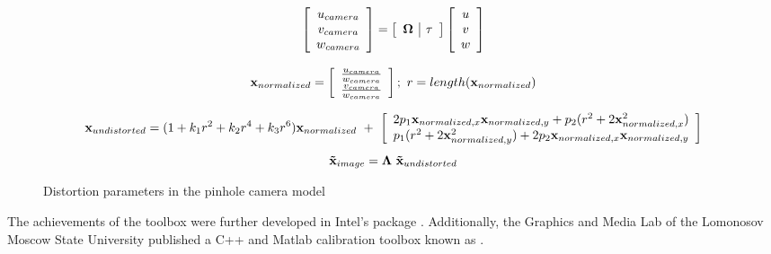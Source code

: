 \documentclass{ucl_thesis}
\begin{document}
\begin{figure}[h!]
    \begin{equation*}
	\left[\begin{array}{c}
		u_{camera} \\
		v_{camera} \\
		w_{camera} \\
	\end{array} \right]
	=
    	\left[\begin{array}{c|c}
	    	{\bf \Omega} & {\bf \tau}
	\end{array} \right]
	\left[\begin{array}{c}
	    u \\
	    	v \\
	    w \\
	\end{array} \right]
    \end{equation*}
    
    \begin{equation*}
	{\bf x}_{normalized} = 
 	\left[\begin{array}{c}
	    \frac{ u_{camera} }{ w_{camera} } \\
	    \frac{ v_{camera} }{ w_{camera} } \\
	\end{array} \right]; 
	~r = length(	{\bf x}_{normalized} )
    \end{equation*}

    \begin{equation*}
	{\bf x}_{undistorted}
	=
	(1 + k_1 r^2 + k_2 r^4 + k_3 r^6 ) {\bf x}_{normalized} 
	~+~ 
	\left[\begin{array}{c}
	    2 p_1 {\bf x}_{normalized,x} {\bf x}_{normalized,y} + p_2 ( r^2 + 2{\bf x}_{normalized,x}^2) \\
	    p_1(r^2+2{\bf x}_{normalized,y}^2) + 2 p_2 {\bf x}_{normalized,x} {\bf x}_{normalized,y}\\
	\end{array} \right]
	\end{equation*}
    \begin{equation*}
		{\bf \tilde{x}}_{image} = {\bf\Lambda} ~ {\bf \tilde{x}}_{undistorted}
    \end{equation*}
    
    \caption{Distortion parameters in the pinhole camera model}
    \label{eq:distortion}
\end{figure}

The achievements of the toolbox were further developed in Intel's \citep{calibration_opencv} package . Additionally, the Graphics and Media Lab of the Lomonosov Moscow State University published a C++ and Matlab calibration toolbox known as \citep{calibration_gml}.
\citep{calibration_rgbdemo}
\end{document}

